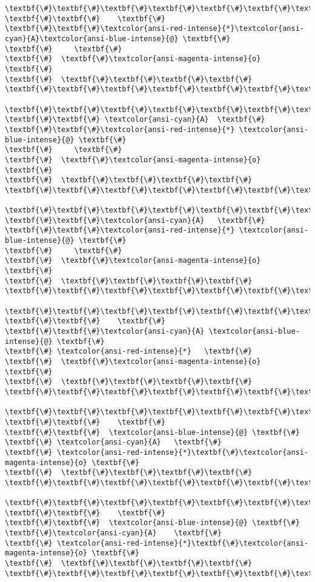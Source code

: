 \documentclass[11pt]{article}
\begin{document}
\begin{Verbatim}[commandchars=\\\{\}]
\textbf{\#}\textbf{\#}\textbf{\#}\textbf{\#}\textbf{\#}\textbf{\#}\textbf{\#}
\textbf{\#}\textbf{\#}    \textbf{\#}
\textbf{\#}\textbf{\#}\textcolor{ansi-red-intense}{*}\textcolor{ansi-cyan}{A}\textcolor{ansi-blue-intense}{@} \textbf{\#}
\textbf{\#}     \textbf{\#}
\textbf{\#}  \textbf{\#}\textcolor{ansi-magenta-intense}{o} \textbf{\#}
\textbf{\#}  \textbf{\#}\textbf{\#}\textbf{\#}\textbf{\#}
\textbf{\#}\textbf{\#}\textbf{\#}\textbf{\#}\textbf{\#}\textbf{\#}\textbf{\#}

\textbf{\#}\textbf{\#}\textbf{\#}\textbf{\#}\textbf{\#}\textbf{\#}\textbf{\#}
\textbf{\#}\textbf{\#} \textcolor{ansi-cyan}{A}  \textbf{\#}
\textbf{\#}\textbf{\#}\textcolor{ansi-red-intense}{*} \textcolor{ansi-blue-intense}{@} \textbf{\#}
\textbf{\#}     \textbf{\#}
\textbf{\#}  \textbf{\#}\textcolor{ansi-magenta-intense}{o} \textbf{\#}
\textbf{\#}  \textbf{\#}\textbf{\#}\textbf{\#}\textbf{\#}
\textbf{\#}\textbf{\#}\textbf{\#}\textbf{\#}\textbf{\#}\textbf{\#}\textbf{\#}

\textbf{\#}\textbf{\#}\textbf{\#}\textbf{\#}\textbf{\#}\textbf{\#}\textbf{\#}
\textbf{\#}\textbf{\#}\textcolor{ansi-cyan}{A}   \textbf{\#}
\textbf{\#}\textbf{\#}\textcolor{ansi-red-intense}{*} \textcolor{ansi-blue-intense}{@} \textbf{\#}
\textbf{\#}     \textbf{\#}
\textbf{\#}  \textbf{\#}\textcolor{ansi-magenta-intense}{o} \textbf{\#}
\textbf{\#}  \textbf{\#}\textbf{\#}\textbf{\#}\textbf{\#}
\textbf{\#}\textbf{\#}\textbf{\#}\textbf{\#}\textbf{\#}\textbf{\#}\textbf{\#}

\textbf{\#}\textbf{\#}\textbf{\#}\textbf{\#}\textbf{\#}\textbf{\#}\textbf{\#}
\textbf{\#}\textbf{\#}    \textbf{\#}
\textbf{\#}\textbf{\#}\textcolor{ansi-cyan}{A} \textcolor{ansi-blue-intense}{@} \textbf{\#}
\textbf{\#} \textcolor{ansi-red-intense}{*}   \textbf{\#}
\textbf{\#}  \textbf{\#}\textcolor{ansi-magenta-intense}{o} \textbf{\#}
\textbf{\#}  \textbf{\#}\textbf{\#}\textbf{\#}\textbf{\#}
\textbf{\#}\textbf{\#}\textbf{\#}\textbf{\#}\textbf{\#}\textbf{\#}\textbf{\#}

\textbf{\#}\textbf{\#}\textbf{\#}\textbf{\#}\textbf{\#}\textbf{\#}\textbf{\#}
\textbf{\#}\textbf{\#}    \textbf{\#}
\textbf{\#}\textbf{\#}  \textcolor{ansi-blue-intense}{@} \textbf{\#}
\textbf{\#} \textcolor{ansi-cyan}{A}   \textbf{\#}
\textbf{\#} \textcolor{ansi-red-intense}{*}\textbf{\#}\textcolor{ansi-magenta-intense}{o} \textbf{\#}
\textbf{\#}  \textbf{\#}\textbf{\#}\textbf{\#}\textbf{\#}
\textbf{\#}\textbf{\#}\textbf{\#}\textbf{\#}\textbf{\#}\textbf{\#}\textbf{\#}

\textbf{\#}\textbf{\#}\textbf{\#}\textbf{\#}\textbf{\#}\textbf{\#}\textbf{\#}
\textbf{\#}\textbf{\#}    \textbf{\#}
\textbf{\#}\textbf{\#}  \textcolor{ansi-blue-intense}{@} \textbf{\#}
\textbf{\#}\textcolor{ansi-cyan}{A}    \textbf{\#}
\textbf{\#} \textcolor{ansi-red-intense}{*}\textbf{\#}\textcolor{ansi-magenta-intense}{o} \textbf{\#}
\textbf{\#}  \textbf{\#}\textbf{\#}\textbf{\#}\textbf{\#}
\textbf{\#}\textbf{\#}\textbf{\#}\textbf{\#}\textbf{\#}\textbf{\#}\textbf{\#}


\end{Verbatim}
\end{document}
